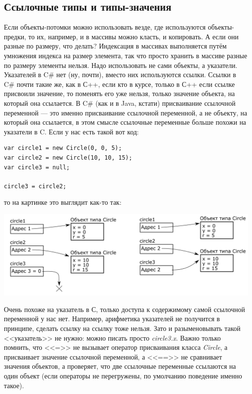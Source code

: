 \documentclass{../../text-style}
\begin{document}
\subsection{Ссылочные типы и типы-значения}

Если объекты-потомки можно использовать везде, где используются объекты-предки, то их, например, и в массивы можно класть, и копировать. А если они разные по размеру, что делать? Индексация в массивах выполняется путём умножения индекса на размер элемента, так что просто хранить в массиве разные по размеру элементы нельзя. Надо использовать не сами объекты, а указатели. Указателей в C\# нет (ну, почти), вместо них используются ссылки. Ссылки в C\# почти такие же, как в С++, если кто в курсе, только в С++ если ссылке присвоили значение, то поменять его уже нельзя, только значение объекта, на который она ссылается. В C\# (как и в Java, кстати) присваивание ссылочной переменной --- это именно присваивание ссылочной переменной, а не объекту, на который она ссылается, в этом смысле ссылочные переменные больше похожи на указатели в C. Если у нас есть такой вот код:

\begin{verbatim}
var circle1 = new Circle(0, 0, 5);
var circle2 = new Circle(10, 10, 15);
var circle3 = null;

circle3 = circle2;
\end{verbatim}

то на картинке это выглядит как-то так:

\begin{center}
    \includegraphics[width=\textwidth]{referenceTypes.png}
\end{center}

Очень похоже на указатель в С, только доступа к содержимому самой ссылочной переменной у нас нет. Например, арифметика указателей не получится в принципе, сделать ссылку на ссылку тоже нельзя. Зато и разыменовывать такой <<указатель>> не нужно: можно писать просто \textit{circle3.x}. Важно только помнить, что <<=>> не вызывает оператор присваивания класса \textit{Circle}, а присваивает значение ссылочной переменной, а <<==>> не сравнивает значения объектов, а проверяет, что две ссылочные переменные ссылаются на один объект (если операторы не перегружены, по умолчанию поведение именно такое).
\end{document}
